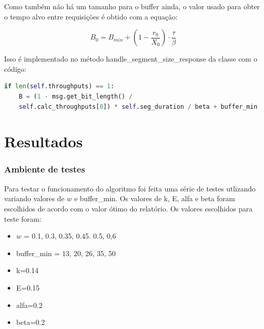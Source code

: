 \documentclass[10pt,twocolumn,letterpaper]{article}
\begin{document}
Como também não há um tamanho para o buffer ainda, o valor usado para obter o tempo alvo entre requisições é obtido com a equação:

\begin{equation}
	B_0 = B_{min} + (1 - \frac{r_0}{X_0}) \cdot \frac{\tau}{\beta}
\end{equation}

Isso é implementado no método handle\_segment\_size\_response da classe com o código:

\begin{lstlisting}[language=python]
	if len(self.throughputs) == 1:
	B = (1 - msg.get_bit_length() /
	self.calc_throughputs[0]) * self.seg_duration / beta + buffer_min
\end{lstlisting}
\section{Resultados}
\subsubsection{Ambiente de testes}
Para testar o funcionamento do algoritmo foi feita uma série de testes utlizando variando valores de $w$ e buffer\_min. Os valores de k, E, alfa e beta foram escolhidos de acordo com o valor ótimo do relatório. Os valores escolhidos para teste foram: 
\begin{itemize}
	\item $w$ = 0.1, 0.3, 0.35, 0.45. 0.5, 0,6
	\item buffer\_min  = 13, 20, 26, 35, 50
	\item k=0.14 
	\item E=0.15 
	\item alfa=0.2
	\item beta=0.2
\end{itemize}
\end{document}

